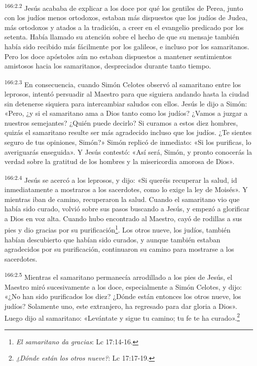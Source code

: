 \par 
\textsuperscript{166:2.2} Jesús acababa de explicar a los doce por qué los gentiles de Perea, junto con los judíos menos ortodoxos, estaban más dispuestos que los judíos de Judea, más ortodoxos y atados a la tradición, a creer en el evangelio predicado por los setenta. Había llamado su atención sobre el hecho de que su mensaje también había sido recibido más fácilmente por los galileos, e incluso por los samaritanos. Pero los doce apóstoles aún no estaban dispuestos a mantener sentimientos amistosos hacia los samaritanos, despreciados durante tanto tiempo.

\par 
\textsuperscript{166:2.3} En consecuencia, cuando Simón Celotes observó al samaritano entre los leprosos, intentó persuadir al Maestro para que siguiera andando hasta la ciudad sin detenerse siquiera para intercambiar saludos con ellos. Jesús le dijo a Simón: «Pero, ¿y si el samaritano ama a Dios tanto como los judíos? ¿Vamos a juzgar a nuestros semejantes? ¿Quién puede decirlo? Si curamos a estos diez hombres, quizás el samaritano resulte ser más agradecido incluso que los judíos. ¿Te sientes seguro de tus opiniones, Simón?» Simón replicó de inmediato: «Si los purificas, lo averiguarás enseguida». Y Jesús contestó: «Así será, Simón, y pronto conocerás la verdad sobre la gratitud de los hombres y la misericordia amorosa de Dios».

\par 
\textsuperscript{166:2.4} Jesús se acercó a los leprosos, y dijo: «Si queréis recuperar la salud, id inmediatamente a mostraros a los sacerdotes, como lo exige la ley de Moisés». Y mientras iban de camino, recuperaron la salud. Cuando el samaritano vio que había sido curado, volvió sobre sus pasos buscando a Jesús, y empezó a glorificar a Dios en voz alta. Cuando hubo encontrado al Maestro, cayó de rodillas a sus pies y dio gracias por su purificación\footnote{\textit{El samaritano da gracias}: Lc 17:14-16.}. Los otros nueve, los judíos, también habían descubierto que habían sido curados, y aunque también estaban agradecidos por su purificación, continuaron su camino para mostrarse a los sacerdotes.

\par 
\textsuperscript{166:2.5} Mientras el samaritano permanecía arrodillado a los pies de Jesús, el Maestro miró sucesivamente a los doce, especialmente a Simón Celotes, y dijo: «¿No han sido purificados los diez? ¿Dónde están entonces los otros nueve, los judíos? Solamente uno, este extranjero, ha regresado para dar gloria a Dios». Luego dijo al samaritano: «Levántate y sigue tu camino; tu fe te ha curado».\footnote{\textit{¿Dónde están los otros nueve?}: Lc 17:17-19.}

